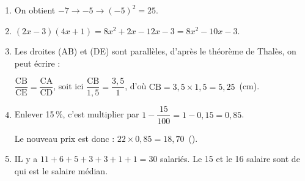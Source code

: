 \documentclass[10pt]{article}
\newcommand{\euro}{\eurologo{}}
\begin{document}
\begin{enumerate}
\item On obtient $- 7 \to - 5 \to (- 5)^2 = 25$.


\item %

$(2x - 3)(4x + 1) = 8x^2 + 2x  - 12x  - 3 = 8x^2 - 10x  - 3$.
\item Les droites (AB) et (DE) sont parallèles, d'après le théorème de Thalès, on peut écrire :

$\dfrac{\text{CB}}{\text{CE}} = \dfrac{\text{CA}}{\text{CD}}$, soit ici $\dfrac{\text{CB}}{1,5} = \dfrac{3,5}{1}$, d'où $\text{CB} = 3,5 \times 1,5 = 5,25$~(cm).

\item %

Enlever 15\,\%, c'est multiplier par $1 - \dfrac{15}{100} = 1 - 0,15 = 0,85$.

Le nouveau prix est donc : $22 \times 0,85 = 18,70$~(\euro).
\item %

%
IL y a $11 + 6 + 5 + 3 + 3 + 1 + 1 = 30$ salariés. Le 15 et le 16 salaire sont de ~\euro{} qui est le salaire médian.


\end{enumerate}
\end{document}
